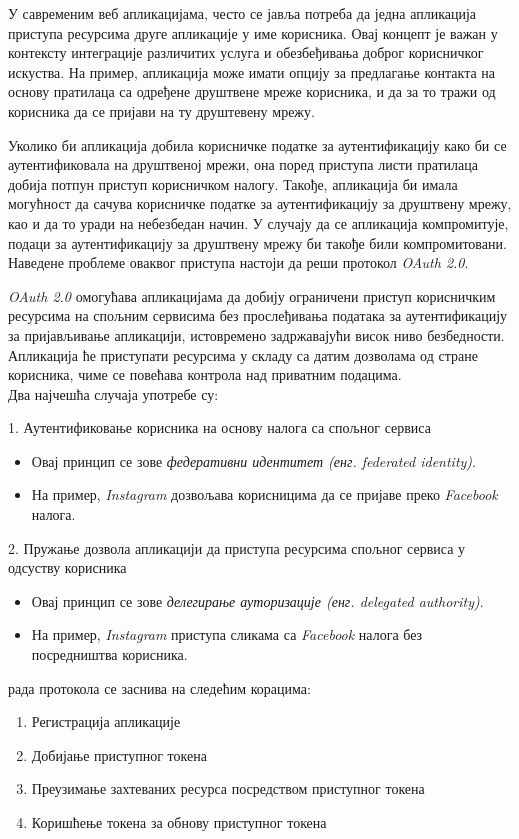 \documentclass[12pt,oneside]{memoir}
\begin{document}
У савременим веб апликацијама, често се јавља потреба да једна апликација приступа ресурсима друге апликације у име корисника. Овај концепт је важан у контексту интеграције различитих услуга и обезбеђивања доброг корисничког искуства. На пример, апликација може имати опцију за предлагање контакта на основу пратилаца са одређене друштвене мреже корисника, и да за то тражи од корисника да се пријави на ту друштевену мрежу.

Уколико би апликација добила корисничке податке за аутентификацију како би се аутентификовала на друштвеној мрежи, она поред приступа листи пратилаца добија потпун приступ корисничком налогу. Такође, апликација би имала могућност да сачува корисничке податке за аутентификацију за друштвену мрежу, као и да то уради на небезбедан начин. У случају да се апликација компромитује, подаци за аутентификацију за друштвену мрежу би такође били компромитовани. Наведене проблеме оваквог приступа настоји да реши протокол \textit{OAuth 2.0}.

\textit{OAuth 2.0} омогућава апликацијама да добију ограничени приступ корисничким ресурсима на спољним сервисима без прослеђивања података за аутентификацију за пријављивање апликацији, истовремено задржавајући висок ниво безбедности. Апликација ће приступати ресурсима у складу са датим дозволама од стране корисника, чиме се повећава контрола над приватним подацима. \\ 
Два најчешћа случаја употребе су:

1. Аутентификовање корисника на основу налога са спољног сервиса
\begin{itemize}[--]
    \item Овај принцип се зове \textit{федеративни идентитет (енг. federated identity)}. 
    \item На пример, \textit{Instagram} дозвољава корисницима да се пријаве преко \textit{Fa\-ce\-book} налога.
\end{itemize}

2. Пружање дозвола апликацији да приступа ресурсима спољног сервиса у одсуству корисника
\begin{itemize}[--]
    \item Овај принцип се зове \textit{делегирање ауторизације (енг. delegated authority)}. 
    \item На пример, \textit{Instagram} приступа сликама са \textit{Facebook} налога без посредништва корисника.
\end{itemize}


 рада протокола се заснива на следећим корацима:
\begin{enumerate}
    \item Регистрација апликације
    \item Добијање приступног токена
    \item Преузимање захтеваних ресурса посредством приступног токена
    \item Коришћење токена за обнову приступног токена
\end{enumerate}
\end{document}
